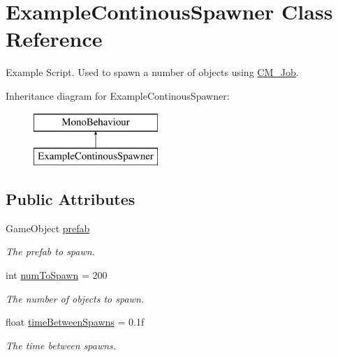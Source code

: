 \hypertarget{class_example_continous_spawner}{}\section{Example\+Continous\+Spawner Class Reference}
\label{class_example_continous_spawner}


Example Script. Used to spawn a number of objects using \hyperlink{class_c_m___job}{C\+M\+\_\+\+Job}.  


Inheritance diagram for Example\+Continous\+Spawner\+:\begin{figure}[H]
\begin{center}
\leavevmode
\includegraphics[height=2.000000cm]{class_example_continous_spawner}
\end{center}
\end{figure}
\subsection*{Public Attributes}
\begin{DoxyCompactItemize}
\item 
Game\+Object \hyperlink{class_example_continous_spawner_ad4617f03c5d944453742b8ce30b25396}{prefab}
\begin{DoxyCompactList}\small\item\em The prefab to spawn. \end{DoxyCompactList}\item 
int \hyperlink{class_example_continous_spawner_af4226a3d4c13b1e447003b3a45e5638f}{num\+To\+Spawn} = 200
\begin{DoxyCompactList}\small\item\em The number of objects to spawn. \end{DoxyCompactList}\item 
float \hyperlink{class_example_continous_spawner_a99d962ed337668df7b9ce0a99042eec1}{time\+Between\+Spawns} = 0.\+1f
\begin{DoxyCompactList}\small\item\em The time between spawns. \end{DoxyCompactList}\end{DoxyCompactItemize}


